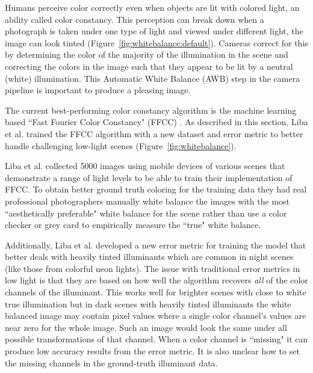 \documentclass{sig-alternate}
\begin{document}
Humans perceive color correctly even when objects are lit with colored light, an ability called color constancy. This perception can break down when a photograph is taken under one type of light and viewed under different light, the image can look tinted (Figure~\ref{fig:whitebalance:default}).
Cameras correct for this by determining the color of the majority of the illumination in the scene and correcting the colors in the image such that they appear to be lit by a neutral (white) illumination. 
This Automatic White Balance (AWB) step in the camera pipeline is important to produce a pleasing image. \cite{blog:Levoy2018}

The current best-performing color constancy algorithm is the machine learning based ``Fast Fourier Color Constancy" (FFCC) \cite{Barron2017}.
As described in this section, Liba et al. trained the FFCC algorithm with a new dataset and error metric to better handle challenging low-light scenes (Figure~\ref{fig:whitebalance}).

Liba et al. collected 5000 images using mobile devices of various scenes that demonstrate a range of light levels to be able to train their implementation of FFCC. To obtain better ground truth coloring for the training data they had real professional photographers manually white balance the images with the most ``aesthetically preferable" white balance for the scene rather than use a color checker or grey card to empirically measure the ``true" white balance.

Additionally, Liba et al. developed a new error metric for training the model that better deals with heavily tinted illuminants which are common in night scenes (like those from colorful neon lights). The issue with traditional error metrics in low light is that they are based on how well the algorithm recovers \emph{all} of the color channels of the illuminant. This works well for brighter scenes with close to white true illumination but in dark scenes with heavily tinted illuminants the white balanced image may contain pixel values where a single color channel's values are near zero for the whole image. Such an image would look the same under all possible transformations of that channel. 
When a color channel is ``missing" it can produce low accuracy results from the error metric. It is also unclear how to set the missing channels in the ground-truth illuminant data.
\end{document}
